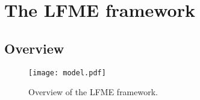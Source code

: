 \documentclass[runningheads]{llncs}
\begin{document}
	


	
	
	
	




	
	
	
	
	
	
	


	
	
	
	\section{The LFME framework}
	\subsection{Overview}
	
	\begin{figure*}[htbp!]
		\centering
		\texttt{[image: model.pdf]}
		\caption{Overview of the LFME framework.}
		\label{fig:model}
	\end{figure*}
	
\end{document}
